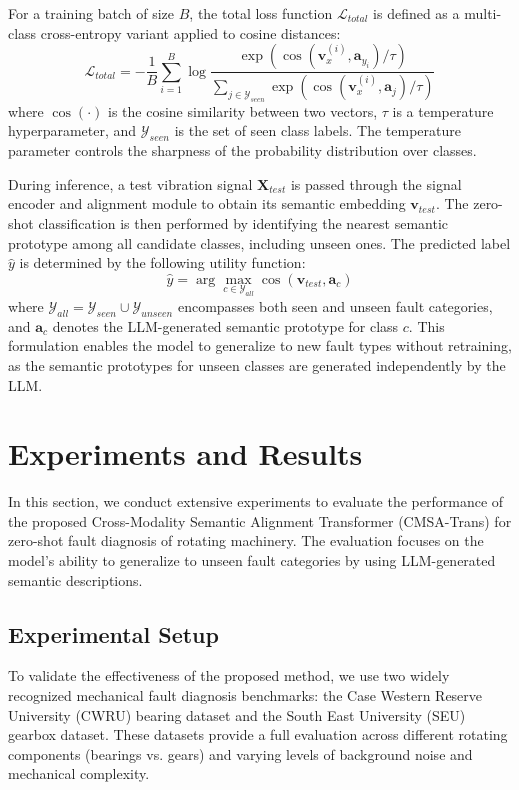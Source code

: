 \documentclass[journal]{IEEEtran}
\begin{document}
For a training batch of size $B$, the total loss function $\mathcal{L}_{total}$ is defined as a multi-class cross-entropy variant applied to cosine distances:
\begin{equation}
\mathcal{L}_{total} = -\frac{1}{B} \sum_{i=1}^{B} \log \frac{\exp(\cos(\mathbf{v}_x^{(i)}, \mathbf{a}_{y_i}) / \tau)}{\sum_{j \in \mathcal{Y}_{seen}} \exp(\cos(\mathbf{v}_x^{(i)}, \mathbf{a}_j) / \tau)}
\end{equation}
where $\cos(\cdot)$ is the cosine similarity between two vectors, $\tau$ is a temperature hyperparameter, and $\mathcal{Y}_{seen}$ is the set of seen class labels. The temperature parameter controls the sharpness of the probability distribution over classes.

During inference, a test vibration signal $\mathbf{X}_{test}$ is passed through the signal encoder and alignment module to obtain its semantic embedding $\mathbf{v}_{test}$. The zero-shot classification is then performed by identifying the nearest semantic prototype among all candidate classes, including unseen ones. The predicted label $\hat{y}$ is determined by the following utility function:
\begin{equation}
\hat{y} = \arg\max_{c \in \mathcal{Y}_{all}} \cos(\mathbf{v}_{test}, \mathbf{a}_c)
\end{equation}
where $\mathcal{Y}_{all} = \mathcal{Y}_{seen} \cup \mathcal{Y}_{unseen}$ encompasses both seen and unseen fault categories, and $\mathbf{a}_c$ denotes the LLM-generated semantic prototype for class $c$. This formulation enables the model to generalize to new fault types without retraining, as the semantic prototypes for unseen classes are generated independently by the LLM.


\section{Experiments and Results}
In this section, we conduct extensive experiments to evaluate the performance of the proposed Cross-Modality Semantic Alignment Transformer (CMSA-Trans) for zero-shot fault diagnosis of rotating machinery. The evaluation focuses on the model's ability to generalize to unseen fault categories by using LLM-generated semantic descriptions.

\subsection{Experimental Setup}
To validate the effectiveness of the proposed method, we use two widely recognized mechanical fault diagnosis benchmarks: the Case Western Reserve University (CWRU) bearing dataset and the South East University (SEU) gearbox dataset. These datasets provide a full evaluation across different rotating components (bearings vs. gears) and varying levels of background noise and mechanical complexity.
\end{document}
